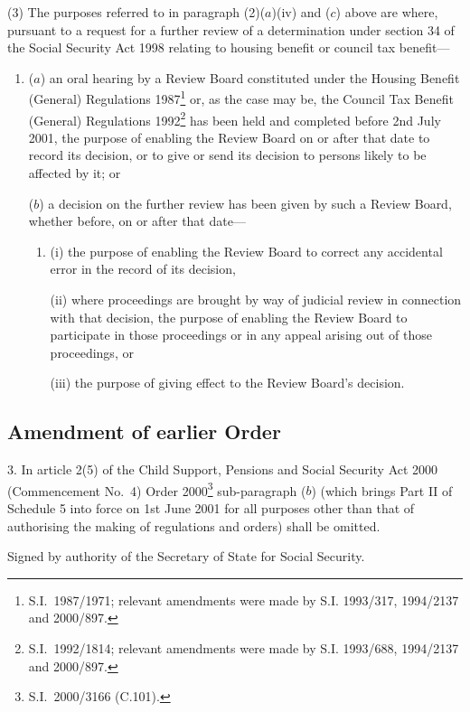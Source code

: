 \documentclass[12pt,a4paper]{article}
\begin{document}
(3) The purposes referred to in paragraph (2)($a$)(iv) and ($c$)  above are where, pursuant to a request for a further review of a determination under section 34 of the Social Security Act 1998 relating to housing benefit or council tax benefit—
\begin{enumerate}\item[]
($a$) an oral hearing by a Review Board constituted under the Housing Benefit (General) Regulations 1987\footnote{S.I.\ 1987/1971; relevant amendments were made by S.I. 1993/317, 1994/2137 and 2000/897.} or, as the case may be, the Council Tax Benefit (General) Regulations 1992\footnote{S.I.\ 1992/1814; relevant amendments were made by S.I. 1993/688, 1994/2137 and 2000/897.} has been held and completed before 2nd July 2001, the purpose of enabling the Review Board on or after that date to record its decision, or to give or send its decision to persons likely to be affected by it; or

($b$) a decision on the further review has been given by such a Review Board, whether before, on or after that date—
\begin{enumerate}\item[]
(i) the purpose of enabling the Review Board to correct any accidental error in the record of its decision,

(ii) where proceedings are brought by way of judicial review in connection with that decision, the purpose of enabling the Review Board to participate in those proceedings or in any appeal arising out of those proceedings, or

(iii) the purpose of giving effect to the Review Board’s decision.
\end{enumerate}
\end{enumerate}

\subsection[3. Amendment of earlier Order]{Amendment of earlier Order}

3.  In article 2(5) of the Child Support, Pensions and Social Security Act 2000 (Commencement No.\ 4) Order 2000\footnote{S.I.\ 2000/3166 (C.101).} sub-paragraph ($b$)  (which brings Part II of Schedule 5 into force on 1st June 2001 for all purposes other than that of authorising the making of regulations and orders) shall be omitted. 

\bigskip

Signed 
by authority of the Secretary of State for Social Security.
\end{document}
